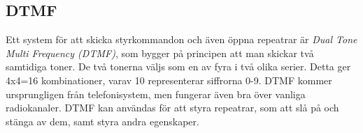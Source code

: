 \subsection{DTMF}

Ett system för att skicka styrkommandon och även öppna repeatrar är
\emph{Dual Tone Multi Frequency (DTMF)}, som bygger på principen att man
skickar två samtidiga toner.
De två tonerna väljs som en av fyra i två olika serier.
Detta ger 4x4=16 kombinationer, varav 10 representerar siffrorna 0-9.
DTMF kommer ursprungligen från telefonisystem, men fungerar även bra över
vanliga radiokanaler.
DTMF kan användas för att styra repeatrar, som att slå på och stänga av dem,
samt styra andra egenskaper.

